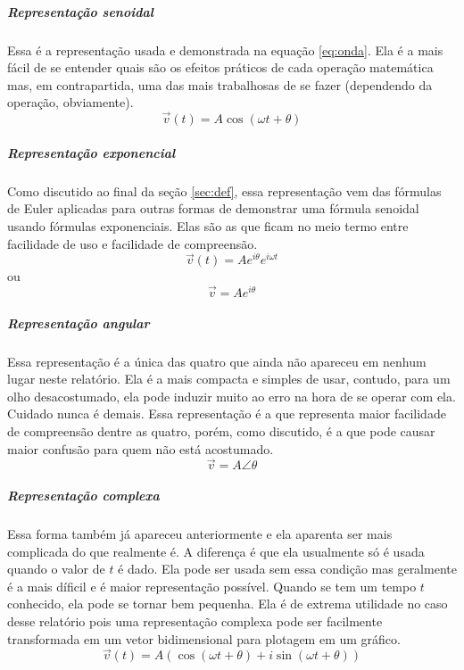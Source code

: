\documentclass[conference,harvard, brazil]{sbatex}
\begin{document}
	\subparagraph{Representação senoidal}Essa é a representação usada e demonstrada na equação \ref{eq:onda}. Ela é a mais fácil de se entender quais são os efeitos práticos de cada operação matemática mas, em contrapartida, uma das mais trabalhosas de se fazer (dependendo da operação, obviamente).
	\begin{equation*}
		\overrightarrow{v}(t) = A\cos(\omega t+\theta)
	\end{equation*}
	
	\subparagraph{Representação exponencial}Como discutido ao final da seção \ref{sec:def}, essa representação vem das fórmulas de Euler aplicadas para outras formas de demonstrar uma fórmula senoidal usando fórmulas exponenciais. Elas são as que ficam no meio termo entre facilidade de uso e facilidade de compreensão.
	\begin{equation*}
		\overrightarrow{v}(t) = Ae^{i\theta}e^{i\omega t}
	\end{equation*}
	ou
	\begin{equation*}
		\overrightarrow{v} = Ae^{i\theta}
	\end{equation*}
	
	\subparagraph{Representação angular}Essa representação é a única das quatro que ainda não apareceu em nenhum lugar neste relatório. Ela é a mais compacta e simples de usar, contudo, para um olho desacostumado, ela pode induzir muito ao erro na hora de se operar com ela. Cuidado nunca é demais. Essa representação é a que representa maior facilidade de compreensão dentre as quatro, porém, como discutido, é a que pode causar maior confusão para quem não está acostumado.
	\begin{equation*}
		\overrightarrow{v} = A\angle\theta
	\end{equation*}
	
	\subparagraph{Representação complexa}Essa forma também já apareceu anteriormente e ela aparenta ser mais complicada do que realmente é. A diferença é que ela usualmente só é usada quando o valor de $t$ é dado. Ela pode ser usada sem essa condição mas geralmente é a mais díficil e é maior representação possível. Quando se tem um tempo $t$ conhecido, ela pode se tornar bem pequenha. Ela é de extrema utilidade no caso desse relatório pois uma representação complexa pode ser facilmente transformada em um vetor bidimensional para plotagem em um gráfico.
	\begin{equation*}
		\overrightarrow{v}(t) = A(\cos(\omega t+\theta) + i\sin(\omega t+\theta))
	\end{equation*}
	
\end{document}
